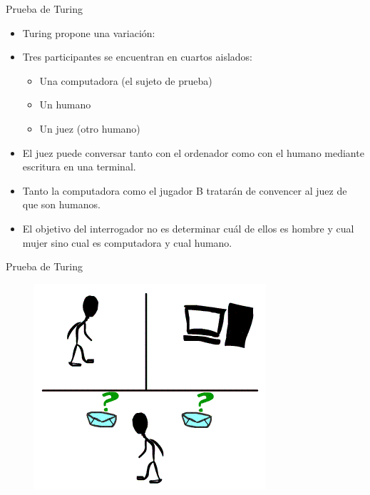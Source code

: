 \documentclass[11pt,aspectratio=169]{beamer}
\begin{document}
\begin{frame}{Prueba de Turing}
        \begin{itemize}
            \item Turing propone una variación: \pause 
            \item Tres participantes se encuentran en cuartos aislados: \pause
                \begin{itemize}
                    \item Una computadora (el sujeto de prueba)\pause
                    \item Un humano \pause 
                    \item Un juez (otro humano) \pause
                \end{itemize}
            \item El juez puede conversar tanto con el ordenador como con el humano mediante escritura 
                en una terminal. \pause
            \item Tanto la computadora como el jugador B tratarán de convencer al juez de que son 
                humanos.\pause
            \item El objetivo del interrogador no es determinar cuál de ellos es hombre y cual mujer sino 
                cual es computadora y cual humano. 
        \end{itemize}
\end{frame}

\begin{frame}{Prueba de Turing}
    \begin{figure}
        \centering
        \href{https://upload.wikimedia.org/wikipedia/commons/3/30/Turing-test.gif}{\includegraphics[scale=0.75]{img/Turing-test.png}}
    \end{figure}
\end{frame}
\end{document}
